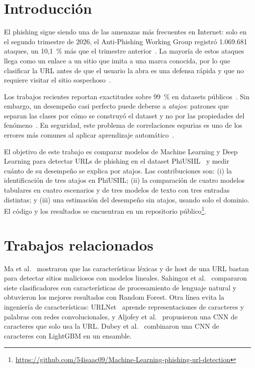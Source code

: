 \section{Introducción}

El phishing sigue siendo una de las amenazas más frecuentes en Internet: solo en el segundo trimestre de 2026, el Anti-Phishing Working Group registró 1.069.681 ataques, un 10,1~\% más que el trimestre anterior~\cite{apwg2026}. La mayoría de estos ataques llega como un enlace a un sitio que imita a una marca conocida, por lo que clasificar la URL antes de que el usuario la abra es una defensa rápida y que no requiere visitar el sitio sospechoso~\cite{ma2009,sahingoz2019}.

Los trabajos recientes reportan exactitudes sobre 99~\% en datasets públicos~\cite{prasad2024,dubey2025}. Sin embargo, un desempeño casi perfecto puede deberse a \emph{atajos}: patrones que separan las clases por cómo se construyó el dataset y no por las propiedades del fenómeno~\cite{geirhos2020}. En seguridad, este problema de correlaciones espurias es uno de los errores más comunes al aplicar aprendizaje automático~\cite{arp2022}.

El objetivo de este trabajo es comparar modelos de Machine Learning y Deep Learning para detectar URLs de phishing en el dataset PhiUSIIL~\cite{prasad2024} y medir cuánto de su desempeño se explica por atajos. Las contribuciones son: (i) la identificación de tres atajos en PhiUSIIL; (ii) la comparación de cuatro modelos tabulares en cuatro escenarios y de tres modelos de texto con tres entradas distintas; y (iii) una estimación del desempeño sin atajos, usando solo el dominio. El código y los resultados se encuentran en un repositorio público\footnote{\url{https://github.com/54isaac09/Machine-Learning-phishing-url-detection}}.

\section{Trabajos relacionados}

Ma et al.~\cite{ma2009} mostraron que las características léxicas y de host de una URL bastan para detectar sitios maliciosos con modelos lineales. Sahingoz et al.~\cite{sahingoz2019} compararon siete clasificadores con características de procesamiento de lenguaje natural y obtuvieron los mejores resultados con Random Forest. Otra línea evita la ingeniería de características: URLNet~\cite{le2018} aprende representaciones de caracteres y palabras con redes convolucionales, y Aljofey et al.~\cite{aljofey2020} propusieron una CNN de caracteres que solo usa la URL. Dubey et al.~\cite{dubey2025} combinaron una CNN de caracteres con LightGBM en un ensamble.

